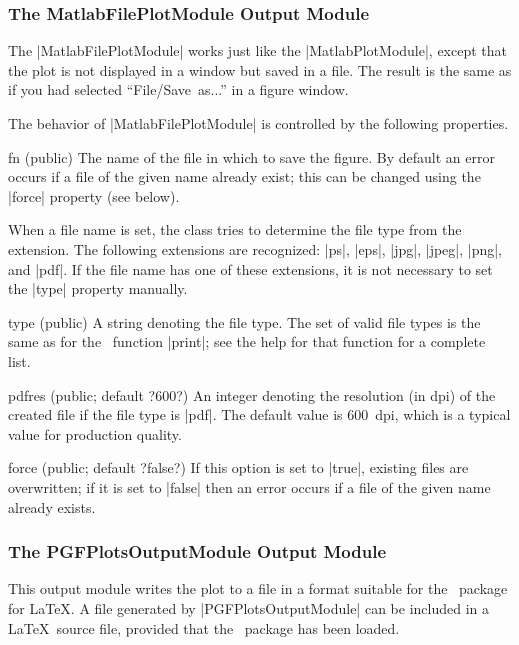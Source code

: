 \subsubsection{The MatlabFilePlotModule Output Module}

The |MatlabFilePlotModule| works just like the |MatlabPlotModule|, except that
the plot is not displayed in a window but saved in a file. The result is the
same as if you had selected ``File\slash Save~as...'' in a figure window. 

The behavior of |MatlabFilePlotModule| is controlled by the following
properties.
\begin{property}{fn (public)}
  The name of the file in which to save the figure. By
  default an error occurs if a file of the given name already exist; this can
  be changed using the |force| property (see below).

  When a file name is set, the class tries to determine the file type from the
  extension. The following extensions are recognized: |ps|, |eps|, |jpg|,
  |jpeg|, |png|, and |pdf|. If the file name has one of these extensions, it
  is not necessary to set the |type| property manually.
\end{property}

\begin{property}{type (public)}
  A string denoting the file type. The set of valid file
  types is the same as for the \matlab\ function |print|; see the help for
  that function for a complete list. 
\end{property}

\begin{property}{pdfres (public; default ?600?)}
  An integer denoting the resolution (in dpi) of the
  created file if the file type is |pdf|. The default value is 600~dpi, which
  is a typical value for production quality.
\end{property}

\begin{property}{force (public; default ?false?)}
   If this option is set to |true|, existing files are overwritten; if it is set
   to |false| then an error occurs if a file of the given name already exists.
\end{property}


\subsubsection{The PGFPlotsOutputModule Output Module}

This output module writes the plot to a file in a format suitable for the
\pgfplots\ package for \LaTeX. A file generated by |PGFPlotsOutputModule| can be
included in a \LaTeX\ source file, provided that the \pgfplots\ package has been
loaded. 

